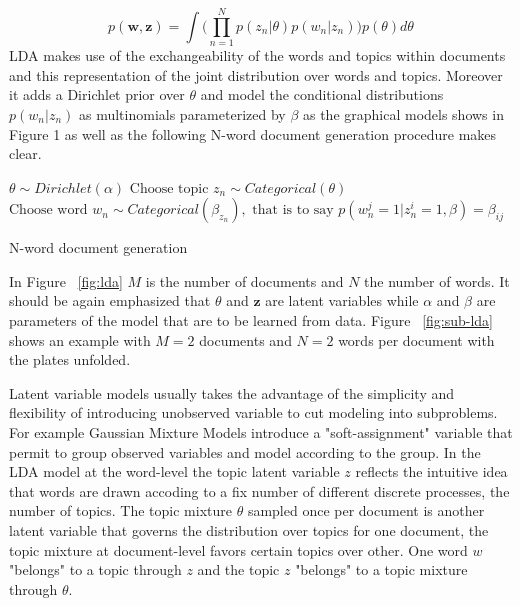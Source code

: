 \documentclass[12pt,a4paper,onecolumn]{article}
\begin{document}
$$p(\mathbf{w}, \mathbf{z})=\int \Big(\prod_{n=1}^N p(z_n|\theta)p(w_n|z_n)\Big)p(\theta)d\theta$$
LDA makes use of the exchangeability of the words and topics within documents and this representation of the joint distribution over words and topics. Moreover it adds a Dirichlet prior over $\theta$ and model the conditional distributions $p(w_n|z_n)$ as multinomials parameterized by $\beta$ as the graphical models shows in Figure 1 as well as the following N-word document generation procedure makes clear.

\begin{algorithm}
	\begin{algorithmic}
		\State $\theta \sim Dirichlet(\alpha)$
		\State $\text{Choose topic } z_n \sim Categorical(\theta)$
		\State $\text{Choose word }w_n \sim Categorical(\beta_{z_n}), \text{ that is to say }p(w_n^j=1|z_n^i=1,\beta)=\beta_{ij}$
		\EndFor
	\end{algorithmic}
	\caption{N-word document generation}
	\label{alg:doc}
\end{algorithm}


{
}{}{}


In Figure ~\ref{fig:lda} $M$ is the number of documents and $N$ the number of words. It should be again emphasized that $\theta$ and $\mathbf{z}$ are latent variables while $\alpha$ and $\beta$ are parameters of the model that are to be learned from data. Figure ~\ref{fig:sub-lda} shows an example with $M=2$ documents and $N=2$ words per document with the plates unfolded.

Latent variable models usually takes the advantage of the simplicity and flexibility of introducing unobserved variable to cut modeling into subproblems. For example Gaussian Mixture Models introduce a "soft-assignment" variable that permit to group observed variables and model according to the group. In the LDA model at the word-level the topic latent variable $z$ reflects the intuitive idea that words are drawn accoding to a fix number of different discrete processes, the number of topics. The topic mixture $\theta$ sampled once per document is another latent variable that governs the distribution over topics for one document, the topic mixture at document-level favors certain topics over other. One word $w$ "belongs" to a topic through $z$ and the topic $z$ "belongs" to a topic mixture through $\theta$.
\end{document}
